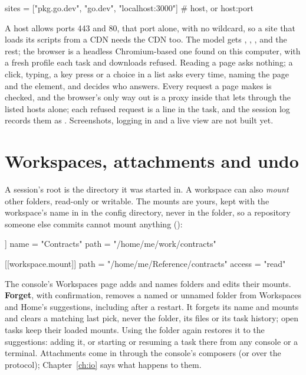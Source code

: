 \begin{txt}
[browser]
sites = ["pkg.go.dev", "go.dev", "localhost:3000"]   # host, or host:port
\end{txt}

A host allows ports 443 and 80,  that port alone, with no
wildcard, so a site that loads its scripts from a CDN needs the CDN too.
The model gets , ,
,  and the rest; the browser is a
headless Chromium-based one found on this computer, with a fresh profile
each task and downloads refused. Reading a page asks nothing; a click,
typing, a key press or a choice in a list asks every time, naming the page
and the element, and  decides who answers. Every
request a page makes is checked, and the browser's only way out is a proxy
inside \nodwyn{} that lets through the listed hosts alone; each refused
request is a line in the task, and the session log records them as
. Screenshots, logging in and a live view are not
built yet.

\chapter{Workspaces, attachments and undo}\label{ch:undo}

A session's root is the directory it was started in. A workspace can also
\emph{mount} other folders, read-only or writable. The mounts are yours,
kept with the workspace's name in  in the config
directory, never in the folder, so a repository someone else commits cannot
mount anything ():

\begin{txt}
[[workspace]]
name = "Contracts"
path = "/home/me/work/contracts"

[[workspace.mount]]
path = "/home/me/Reference/contracts"
access = "read"
\end{txt}

The console's Workspaces page adds and names folders and edits their mounts.
\textbf{Forget}, with confirmation, removes a named or unnamed folder from
Workspaces and Home's suggestions, including after a restart. It forgets
its name and mounts and clears a matching last pick, never the folder,
its files or its task history; open tasks keep their loaded mounts.
Using the folder again restores it to the suggestions: adding it, or
starting or resuming a task there from any console or a terminal.
Attachments come in through the console's composers (or
 over the protocol); Chapter~\ref{ch:io} says what
happens to them.


